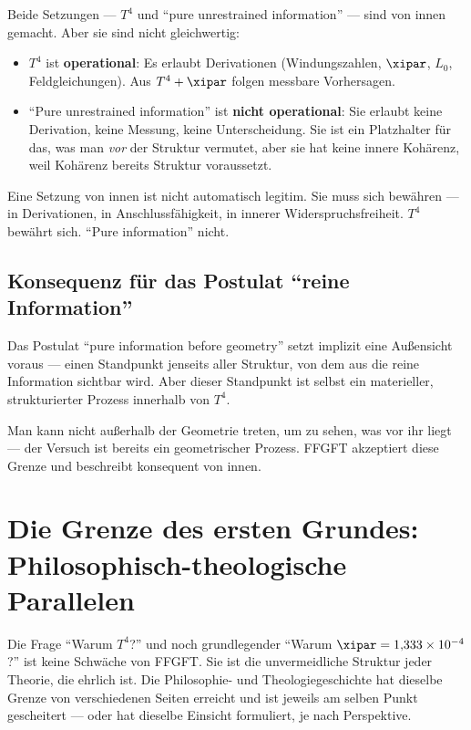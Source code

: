 \begin{wichtig}
Beide Setzungen --- $T^4$ und ``pure unrestrained information'' --- sind von innen gemacht. Aber sie sind nicht gleichwertig:
\begin{itemize}
  \item $T^4$ ist \textbf{operational}: Es erlaubt Derivationen (Windungszahlen, $\xipar$, $L_0$, Feldgleichungen). Aus $T^4 + \xipar$ folgen messbare Vorhersagen.
  \item ``Pure unrestrained information'' ist \textbf{nicht operational}: Sie erlaubt keine Derivation, keine Messung, keine Unterscheidung. Sie ist ein Platzhalter für das, was man \emph{vor} der Struktur vermutet, aber sie hat keine innere Kohärenz, weil Kohärenz bereits Struktur voraussetzt.
\end{itemize}
Eine Setzung von innen ist nicht automatisch legitim. Sie muss sich bewähren --- in Derivationen, in Anschlussfähigkeit, in innerer Widerspruchsfreiheit. $T^4$ bewährt sich. ``Pure information'' nicht.
\end{wichtig}

\subsection{Konsequenz für das Postulat ``reine Information''}

Das Postulat ``pure information before geometry'' setzt implizit eine Außensicht voraus --- einen Standpunkt jenseits aller Struktur, von dem aus die reine Information sichtbar wird. Aber dieser Standpunkt ist selbst ein materieller, strukturierter Prozess innerhalb von $T^4$.

Man kann nicht außerhalb der Geometrie treten, um zu sehen, was vor ihr liegt --- der Versuch ist bereits ein geometrischer Prozess. FFGFT akzeptiert diese Grenze und beschreibt konsequent von innen.

\section{Die Grenze des ersten Grundes: Philosophisch-theologische Parallelen}

Die Frage ``Warum $T^4$?'' und noch grundlegender ``Warum $\xipar = 1{,}333 \times 10^{-4}$?'' ist keine Schwäche von FFGFT. Sie ist die unvermeidliche Struktur jeder Theorie, die ehrlich ist. Die Philosophie- und Theologiegeschichte hat dieselbe Grenze von verschiedenen Seiten erreicht und ist jeweils am selben Punkt gescheitert --- oder hat dieselbe Einsicht formuliert, je nach Perspektive.

